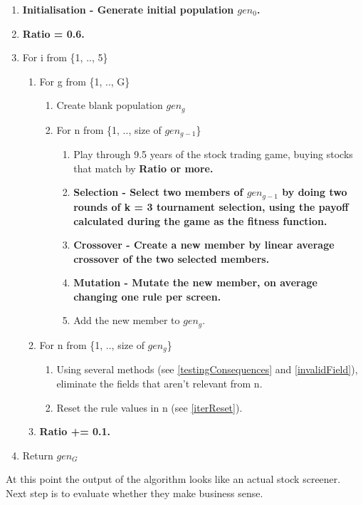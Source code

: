 \begin{enumerate}
    \item \bf Initialisation \rm - Generate initial population $gen_{0}$.
    \item \bf Ratio \rm = 0.6.
    \item For i from \{1, .., 5\}
    \begin{enumerate}
        \item For g from \{1, .., G\}
        \begin{enumerate}
            \item Create blank population $gen_{g}$
            \item For n from \{1, .., size of $gen_{g-1}$\}
            \begin{enumerate}
                \item Play through 9.5 years of the stock trading game, buying stocks that match by \bf Ratio \rm or more.
                \item \bf Selection \rm - Select two members of $gen_{g-1}$ by doing two rounds of k = 3 tournament selection, using the payoff calculated during the game as the fitness function.
                \item \bf Crossover \rm - Create a new member by linear average crossover of the two selected members.
                \item \bf Mutation \rm - Mutate the new member, on average changing one rule per screen.
                \item Add the new member to $gen_{g}$.
            \end{enumerate}
        \end{enumerate}
        \item For n from \{1, .., size of $gen_{g}$\}
        \begin{enumerate}
            \item Using several methods (see \ref{testingConsequences} and \ref{invalidField}), eliminate the fields that aren't relevant from n.
            \item Reset the rule values in n (see \ref{iterReset}).
        \end{enumerate}
        \item \bf Ratio \rm += 0.1.
    \end{enumerate}
    \item Return $gen_{G}$
\end{enumerate}

At this point the output of the algorithm looks like an actual stock screener. Next step is to evaluate whether they make business sense.